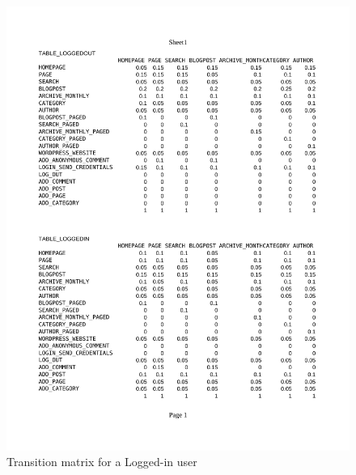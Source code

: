   \begin{figure}[t]
    \centering %
    \includegraphics[trim=2cm 14cm 2cm 3.2cm, clip=true, scale=0.85]{src/img/transitionTable.pdf}
    \caption{Transition matrix for a Logged-in user}
    \label{figure:transition-table}
  \end{figure}

